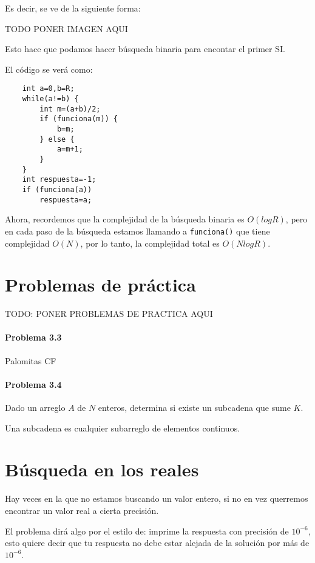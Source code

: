 Es decir, se ve de la siguiente forma:

TODO PONER IMAGEN AQUI

Esto hace que podamos hacer búsqueda binaria para encontar el primer SI.

El código se verá como:

\begin{lstlisting}
	int a=0,b=R;
	while(a!=b) {
		int m=(a+b)/2;
		if (funciona(m)) {
			b=m;
		} else {
			a=m+1;
		}
	}
	int respuesta=-1;
	if (funciona(a))
		respuesta=a;
\end{lstlisting}

Ahora, recordemos que la complejidad de la búsqueda binaria es \(O(logR)\), pero en cada paso de la búsqueda estamos llamando a \verb|funciona()| que tiene complejidad \(O(N)\), por lo tanto, la complejidad total es \(O(NlogR)\).

\section*{Problemas de práctica}
TODO: PONER PROBLEMAS DE PRACTICA AQUI
\paragraph{Problema 3.3} Palomitas CF\\

\problembreak

\paragraph{Problema 3.4} Dado un arreglo \(A\) de \(N\) enteros, determina si existe un subcadena que sume \(K\).

Una subcadena es cualquier subarreglo de elementos continuos.

\newpage
\section*{Búsqueda en los reales}

Hay veces en la que no estamos buscando un valor entero, si no en vez querremos encontrar un valor real a cierta precisión.

El problema dirá algo por el estilo de: imprime la respuesta con precisión de \(10^{-6}\), esto quiere decir que tu respuesta no debe estar alejada de la solución por más de \(10^{-6}\).

